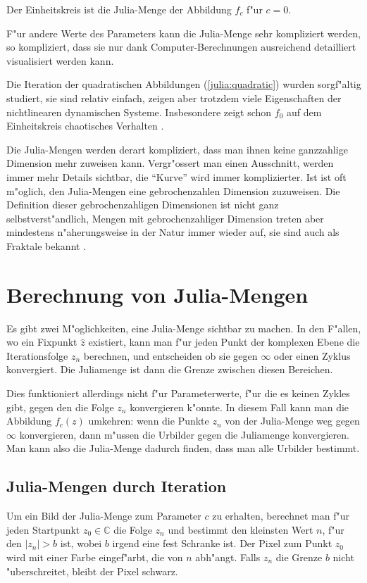 \begin{refsection}
\begin{beispiel}
Der Einheitskreis ist die Julia-Menge der Abbildung $f_c$ f"ur $c=0$.
\end{beispiel}

F"ur andere Werte des Parameters kann die Julia-Menge sehr kompliziert
werden, so kompliziert, dass sie nur dank Computer-Berechnungen
ausreichend detailliert visualisiert werden kann.

Die Iteration der quadratischen Abbildungen (\ref{julia:quadratic})
wurden sorgf"altig studiert, sie sind relativ einfach, zeigen aber
trotzdem viele Eigenschaften der nichtlinearen dynamischen Systeme.
Insbesondere zeigt schon $f_0$ auf dem Einheitskreis chaotisches
Verhalten \cite{julia:devaney}.

Die Julia-Mengen werden derart kompliziert, dass man ihnen keine ganzzahlige
Dimension mehr zuweisen kann. Vergr"ossert man einen Ausschnitt, werden
immer mehr Details sichtbar, die ``Kurve'' wird immer komplizierter.
Ist ist oft m"oglich, den Julia-Mengen eine gebrochenzahlen Dimension
zuzuweisen.
Die Definition dieser gebrochenzahligen Dimensionen ist nicht ganz
selbstverst"andlich, Mengen mit gebrochenzahliger Dimension treten
aber mindestens n"aherungsweise in der Natur immer wieder auf, sie
sind auch als Fraktale bekannt \cite{julia:falconer}.

\section{Berechnung von Julia-Mengen}
Es gibt zwei M"oglichkeiten, eine Julia-Menge sichtbar zu machen.
In den F"allen, wo ein Fixpunkt $\hat z$ existiert, kann man f"ur jeden
Punkt der komplexen Ebene die Iterationsfolge $z_n$ berechnen, und
entscheiden ob sie gegen $\infty$ oder einen Zyklus konvergiert.
Die Juliamenge ist dann die Grenze zwischen diesen Bereichen.

Dies funktioniert allerdings nicht f"ur Parameterwerte, f"ur die
es keinen Zykles gibt, gegen den die Folge $z_n$ konvergieren k"onnte.
In diesem Fall kann man die Abbildung $f_c(z)$ umkehren: wenn die
Punkte $z_n$ von der Julia-Menge weg gegen $\infty$ konvergieren, dann 
m"ussen die Urbilder gegen die Juliamenge konvergieren.
Man kann also die Julia-Menge dadurch finden, dass man alle Urbilder
bestimmt.

\subsection{Julia-Mengen durch Iteration}
Um ein Bild der Julia-Menge zum Parameter $c$ zu erhalten, berechnet
man f"ur jeden Startpunkt $z_0\in\mathbb C$ die Folge $z_n$ und
bestimmt den kleinsten Wert $n$, f"ur den $|z_n|>b$ ist, wobei $b$
irgend eine fest Schranke ist.
Der Pixel zum Punkt $z_0$ wird mit einer Farbe eingef"arbt, die von $n$
abh"angt.
Falls $z_n$ die Grenze $b$ nicht "uberschreitet, bleibt der Pixel schwarz.


\end{refsection}
